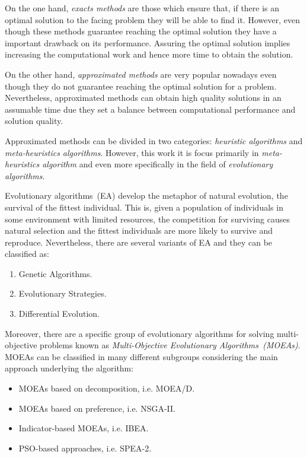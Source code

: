 On the one hand, \textit{exacts methods} are those which ensure that, if there is an optimal solution to the facing problem they will be able to find it. However, even though these methods guarantee reaching the optimal solution they have a important drawback on its performance. Assuring the optimal solution implies increasing the computational work and hence more time to obtain the solution.

On the other hand, \textit{approximated methods} are very popular nowadays even though they do not guarantee reaching the optimal solution for a problem. Nevertheless, approximated methods can obtain high quality solutions in an assumable time due they set a balance between computational performance and solution quality. 

Approximated methods can be divided in two categories: \textit{heuristic algorithms} and \textit{meta-heuristics algorithms}. However, this work it is focus primarily in \textit{meta-heuristics algorithm} and even more specifically in the field of \textit{evolutionary algorithms}.

Evolutionary algorithms~(EA) develop the metaphor of natural evolution, the survival of the fittest individual\cite{eiben}. This is, given a population of individuals in some environment with limited resources, the competition for surviving causes natural selection and the fittest individuals are more likely to survive and reproduce. Nevertheless, there are several variants of EA and they can be classified as:
\begin{enumerate}
    \item Genetic Algorithms\cite{Whitley1994, Algorithms2004, Sivanandam2008}.
    \item Evolutionary Strategies\cite{Beyer2002, Hansen2017}.
    \item Differential Evolution\cite{Algorithm2006, DE1, DE2, DE3}.
\end{enumerate}

Moreover, there are a specific group of evolutionary algorithms for solving multi-objective problems known as \textit{Multi-Objective Evolutionary Algorithms~(MOEAs)}. MOEAs can be classified in many different subgroups considering the main approach underlying the algorithm\cite{ZHOU201132}:
\begin{itemize}
    \item MOEAs based on decomposition, i.e. MOEA/D\cite{Zhang2007, Ma2018}.
    \item MOEAs based on preference, i.e. NSGA-II\cite{996017}.
    \item Indicator-based MOEAs, i.e. IBEA\cite{IBEA}.
    \item PSO-based approaches, i.e. SPEA-2\cite{Laumanns2001SPEA2}.
\end{itemize}

